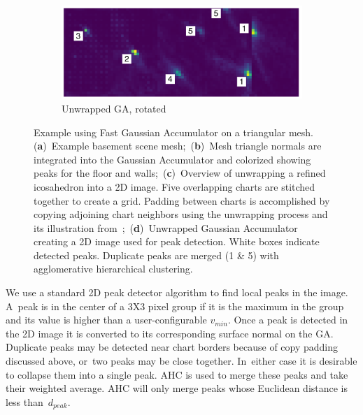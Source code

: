 \begin{figure}[H]
\begin{subfigure}[t]{.55\linewidth}
  \end{subfigure}
  \hfill
  \begin{subfigure}[t]{.40\linewidth}
    \centering\includegraphics[clip,trim=0cm 0cm 0cm 0cm,width=.95\linewidth]{chapter_3_polylidar3d/imgs/ga_examples-ga_basement_unwrapped_v2.pdf}
    \caption{Unwrapped GA, rotated \label{fig:ch3_basement_unwrapped}}\vspace{6pt}
  \end{subfigure}
  \caption[Example using Fast Gaussian Accumulator on a triangular mesh]{Example using Fast Gaussian Accumulator on a triangular mesh. (\textbf{a})~Example basement scene mesh;~(\textbf{b})~Mesh triangle normals are integrated into the Gaussian Accumulator and colorized showing peaks for the floor and walls;~(\textbf{c})~Overview of unwrapping a refined icosahedron into a 2D image. Five overlapping charts are stitched together to create a grid. Padding between charts is accomplished by copying adjoining chart neighbors using the unwrapping process and its illustration from~\cite{cohen_gauge_2019};~(\textbf{d})~Unwrapped Gaussian Accumulator creating a 2D image used for peak detection.  White boxes indicate detected peaks. Duplicate peaks are merged (1 \& 5) with agglomerative hierarchical clustering. 
  }\label{fig:ch3_peak_detection}
\end{figure}

We use a standard 2D peak detector algorithm to find local peaks in the image. A~peak is in the center of a 3X3 pixel group if it is the maximum in the group and its value is higher than a user-configurable $v_{min}$. Once a peak is detected in the 2D image it is converted to its corresponding surface normal on the GA. Duplicate peaks may be detected near chart borders because of copy padding discussed above, or~two peaks may be close together. In~either case it is desirable to collapse them into a single peak.  \ac{AHC} is used to merge these peaks and take their weighted average. \ac{AHC} will only merge peaks whose Euclidean distance is less than~$d_{peak}$. 



